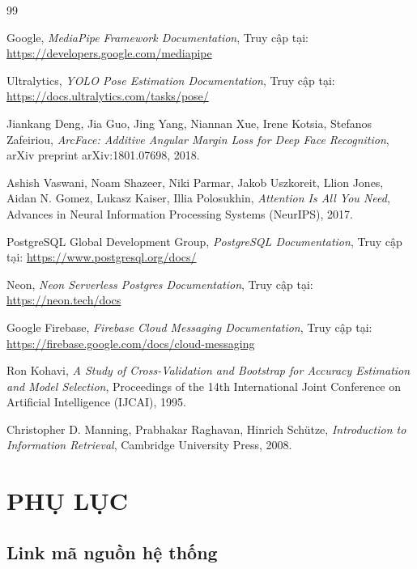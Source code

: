 \documentclass[12pt]{report}
\begin{document}
\begin{thebibliography}{99}
Google,
\textit{MediaPipe Framework Documentation},
Truy cập tại: \url{https://developers.google.com/mediapipe}

Ultralytics,
\textit{YOLO Pose Estimation Documentation},
Truy cập tại: \url{https://docs.ultralytics.com/tasks/pose/}

Jiankang Deng, Jia Guo, Jing Yang, Niannan Xue, Irene Kotsia, Stefanos Zafeiriou,
\textit{ArcFace: Additive Angular Margin Loss for Deep Face Recognition},
arXiv preprint arXiv:1801.07698, 2018.

Ashish Vaswani, Noam Shazeer, Niki Parmar, Jakob Uszkoreit, Llion Jones, Aidan N. Gomez, Lukasz Kaiser, Illia Polosukhin,
\textit{Attention Is All You Need},
Advances in Neural Information Processing Systems (NeurIPS), 2017.

PostgreSQL Global Development Group,
\textit{PostgreSQL Documentation},
Truy cập tại: \url{https://www.postgresql.org/docs/}

Neon,
\textit{Neon Serverless Postgres Documentation},
Truy cập tại: \url{https://neon.tech/docs}

Google Firebase,
\textit{Firebase Cloud Messaging Documentation},
Truy cập tại: \url{https://firebase.google.com/docs/cloud-messaging}

Ron Kohavi,
\textit{A Study of Cross-Validation and Bootstrap for Accuracy Estimation and Model Selection},
Proceedings of the 14th International Joint Conference on Artificial Intelligence (IJCAI), 1995.

Christopher D. Manning, Prabhakar Raghavan, Hinrich Schütze,
\textit{Introduction to Information Retrieval},
Cambridge University Press, 2008.

\end{thebibliography}


\appendix
\chapter*{PHỤ LỤC}

\section*{ Link mã nguồn hệ thống}
\end{document}

